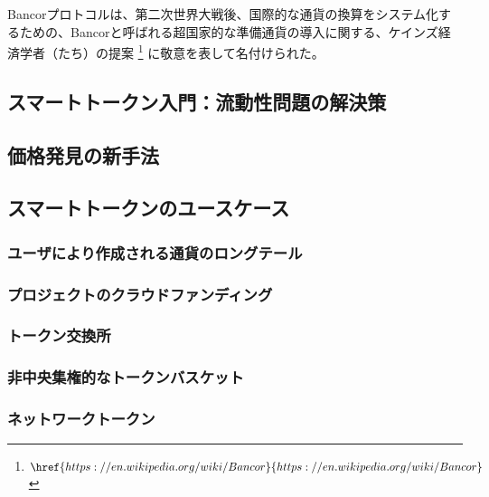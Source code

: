 \documentclass{jsarticle}
\begin{document}
Bancorプロトコルは、第二次世界大戦後、国際的な通貨の換算をシステム化するための、Bancorと呼ばれる超国家的な準備通貨の導入に関する、ケインズ経済学者（たち）の提案
\footnote{
  $\href{
    https://en.wikipedia.org/wiki/Bancor
  }{
    https://en.wikipedia.org/wiki/Bancor
  }$
}
に敬意を表して名付けられた。

  \subsection{スマートトークン入門：流動性問題の解決策}



  \subsection{価格発見の新手法}



  \subsection{スマートトークンのユースケース}



    \subsubsection{ユーザにより作成される通貨のロングテール}



    \subsubsection{プロジェクトのクラウドファンディング}



    \subsubsection{トークン交換所}



    \subsubsection{非中央集権的なトークンバスケット}



    \subsubsection{ネットワークトークン}
\end{document}
